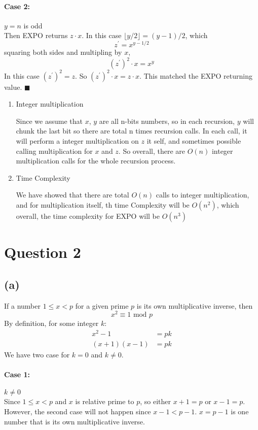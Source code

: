 \documentclass{article}
\begin{document}
\paragraph{Case 2: } $y = n$ is odd\\
Then EXPO returns $z \cdot x$. In this case $\lfloor y/2 \rfloor = (y-1)/2$, which 
$$z^\prime = x^{y-1/2}$$
squaring both sides and multipling by $x$,
$$(z^\prime)^2 \cdot x = x^{y} $$
In this case $ (z^\prime)^2 = z$. So $(z^\prime)^2 \cdot x = z \cdot x$. This matched the EXPO returning value. $\blacksquare$
\\
\begin{enumerate}
\item{Integer multiplication}

Since we assume that $x$, $y$ are all n-bits numbers, so in each recursion, $y$ will chunk the last bit so there are total n times recursion calls.
In each call, it will perform a integer multiplication on $z$ it self, and sometimes possible calling multiplication for $x$ and $z$. So overall, there are $O(n)$ integer multiplication calls for the whole recursion process.

\item{Time Complexity}

We have showed that there are total $O(n)$ calls to integer multiplication, and for multiplication itself, th time Complexity will be $O(n^2)$, which overall, the time complexity for EXPO will be $O(n^3)$

\end{enumerate}


\section*{Question 2}
    \subsection*{(a)}
    If a number $ 1 \leq x < p$ for a given prime $p$ is its own multiplicative inverse, then
    $$x^2 \equiv 1 \mbox{ mod } p$$
    By definition, for some integer $k$: 
\begin{align}
    x^2 - 1 &= pk \nonumber \\
    (x+1)(x-1) &= pk \nonumber
\end{align}
We have two case for $k = 0$ and $k \neq 0$.

\paragraph{Case 1: }$k \neq 0$ \\
Since  $ 1 \leq x < p$ and $x$ is relative prime to $p$, so either $x+1 = p$ or $x-1 = p$. However, the second case will not happen since $x-1 < p-1$.
$x = p-1$ is one number that is its own multiplicative inverse.
\end{document}

